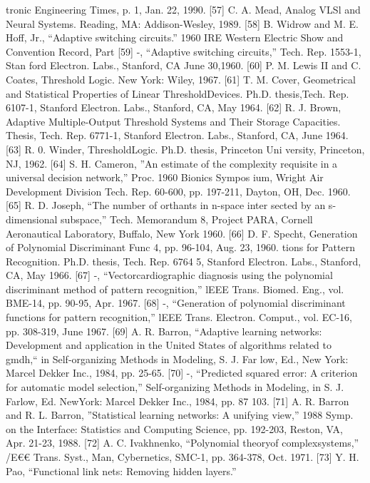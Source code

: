 \documentclass[11pt,a4paper,twocolumn]{article}
\begin{document}
{{tronic Engineering Times, p. 1, Jan. 22, 1990. 
[57] C. A. Mead, Analog VLSl and Neural Systems. Reading, MA: 
Addison-Wesley, 1989. 
[58] B. Widrow and M. E. Hoff, Jr., “Adaptive switching circuits.” 
1960 IRE Western Electric Show and Convention Record, Part 
[59] -, 
“Adaptive switching circuits,” Tech. Rep. 1553-1, Stan
ford Electron. Labs., Stanford, CA June 30,1960. 
[60] P. M. Lewis II and C. Coates, Threshold Logic. New York: 
Wiley, 1967. 
[61] T. M. Cover, Geometrical and Statistical Properties of Linear 
ThresholdDevices. Ph.D. thesis,Tech. Rep. 6107-1, Stanford 
Electron. Labs., Stanford, CA, May 1964. 
[62] R. J. Brown, Adaptive Multiple-Output Threshold Systems 
and Their Storage Capacities. Thesis, Tech. Rep. 6771-1, 
Stanford Electron. Labs., Stanford, CA, June 1964. 
[63] R. 0. Winder, ThresholdLogic. Ph.D. thesis, Princeton Uni
versity, Princeton, NJ, 1962. 
[64] S. H. Cameron, ”An estimate of the complexity requisite in 
a universal decision network,” Proc. 1960 Bionics Sympos
ium, Wright Air Development Division Tech. Rep. 60-600, 
pp. 197-211, Dayton, OH, Dec. 1960. 
[65] R. D. Joseph, “The number of orthants in n-space inter
sected by an s-dimensional subspace,” Tech. Memorandum 
8, Project PARA, Cornell Aeronautical Laboratory, Buffalo, 
New York 1960. 
[66] D. F. Specht, Generation of Polynomial Discriminant Func
4, pp. 96-104, Aug. 23, 1960. 
tions for Pattern Recognition. Ph.D. thesis, Tech. Rep. 6764
5, Stanford Electron. Labs., Stanford, CA, May 1966. 
[67] -, 
“Vectorcardiographic diagnosis using the polynomial 
discriminant method of pattern recognition,” lEEE Trans. 
Biomed. Eng., vol. BME-14, pp. 90-95, Apr. 1967. 
[68] -, 
“Generation of polynomial discriminant functions for 
pattern recognition,” lEEE Trans. Electron. Comput., vol. 
EC-16, pp. 308-319, June 1967. 
[69] A. R. Barron, “Adaptive learning networks: Development 
and application in the United States of algorithms related 
to gmdh,“ in Self-organizing Methods in Modeling, S. J. Far
low, Ed., New York: Marcel Dekker Inc., 1984, pp. 25-65. 
[70] -, 
“Predicted squared error: A criterion for automatic 
model selection,” Self-organizing Methods in Modeling, in 
S. J. Farlow, Ed. NewYork: Marcel Dekker Inc., 1984, pp. 87
103. 
[71] A. R. Barron and R. L. Barron, ”Statistical learning networks: 
A unifying view,” 1988 Symp. on the Interface: Statistics and 
Computing Science, pp. 192-203, Reston, VA, Apr. 21-23, 
1988. 
[72] A. C. Ivakhnenko, “Polynomial theoryof complexsystems,” 
/E€€ Trans. Syst., Man, Cybernetics, SMC-1, pp. 364-378, Oct. 
1971. 
[73] Y. H. Pao, “Functional link nets: Removing hidden layers.” 
}}
\end{document}
